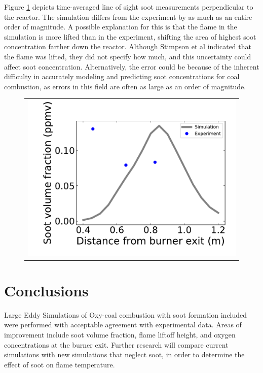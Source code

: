 \documentclass[review,3p]{elsarticle}
\begin{document}
 



Figure \ref{f:fvplot} depicts time-averaged line of sight soot measurements perpendicular to the reactor.  The simulation differs from the experiment by as much as an entire order of magnitude.  A possible explanation for this is that the flame in the simulation is more lifted than in the experiment, shifting the area of highest soot concentration farther down the reactor.  Although Stimpson et al \cite{Stimpson2013} indicated that the flame was lifted, they did not specify how much, and this uncertainty could affect soot concentration.  Alternatively, the error could be because of the inherent difficulty in accurately modeling and predicting soot concentrations for coal combustion, as errors in this field are often as large as an order of magnitude. 

\begin{figure}[!h]
\begin{center}
\begin{tabular}{c}
\includegraphics[width=4 in]{../figures/fv_plot/fv_plot.pdf}
\end{tabular}
\caption{   }
\label{f:fvplot}
\end{center}
\end{figure}


\section{Conclusions}
%
	Large Eddy Simulations of Oxy-coal combustion with soot formation included were performed with acceptable agreement with experimental data.  Areas of improvement include soot volume fraction, flame liftoff height, and oxygen concentrations at the burner exit.  Further research will compare current simulations with new simulations that neglect soot, in order to determine the effect of soot on flame temperature.
\end{document}
